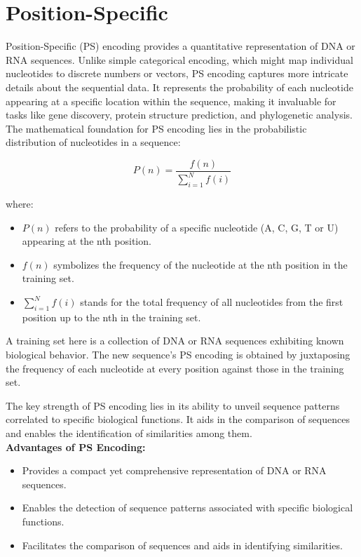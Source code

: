 \section{Position-Specific}

Position-Specific (PS) encoding provides a quantitative representation of DNA or
RNA sequences. Unlike simple categorical encoding, which might map individual
nucleotides to discrete numbers or vectors, PS encoding captures more intricate
details about the sequential data. It represents the probability of each nucleotide
appearing at a specific location within the sequence, making it invaluable for
tasks like gene discovery, protein structure prediction, and phylogenetic analysis.\\

\noindent
The mathematical foundation for PS encoding lies in the probabilistic distribution of nucleotides in a sequence:

\begin{equation}
  P(n) = \frac{f(n)}{\sum_{i=1}^N f(i)}
\end{equation}

\noindent
where:
\begin{itemize}
  \item $P(n)$ refers to the probability of a specific nucleotide (A, C, G, T or U) appearing at the nth position.
    
  \item $f(n)$ symbolizes the frequency of the nucleotide at the nth position in the training set.
    
  \item $\sum_{i=1}^N f(i)$ stands for the total frequency of all nucleotides from the first position up to the nth in the training set.
\end{itemize}

\noindent
A training set here is a collection of DNA or RNA sequences exhibiting known biological behavior. The new sequence's PS encoding is obtained by juxtaposing the frequency of each nucleotide at every position against those in the training set.

The key strength of PS encoding lies in its ability to unveil sequence patterns correlated to specific biological functions. It aids in the comparison of sequences and enables the identification of similarities among them.\\

\noindent
\textbf{Advantages of PS Encoding:}
\begin{itemize}
  \item Provides a compact yet comprehensive representation of DNA or RNA sequences.
  \item Enables the detection of sequence patterns associated with specific biological functions.
  \item Facilitates the comparison of sequences and aids in identifying similarities.
\end{itemize}

